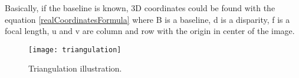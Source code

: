 \documentclass[../../../../main]{subfiles}
\begin{document}
Basically, if the baseline is known, 3D coordinates could be found with the equation \ref{realCoordinatesFormula} where B is a baseline, d is a disparity, f is a focal length, u and v are column and row with the origin in center of the image.

\begin{figure} [ht]
    \begin{center}
        \texttt{[image: triangulation]}
        \caption{Triangulation illustration.}
        \label{fig:triangulation}
    \end{center}
\end{figure}
\end{document}
